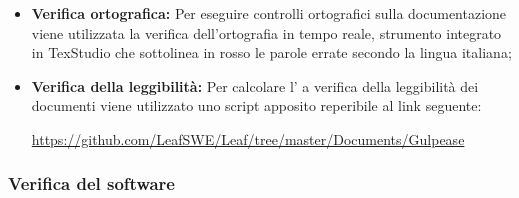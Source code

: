 \documentclass[../NormediProgetto.tex]{subfiles}
\begin{document}
	\begin{itemize}
		\item \textbf{Verifica ortografica:} Per eseguire controlli ortografici sulla documentazione viene utilizzata la verifica dell’ortografia in tempo reale, strumento integrato in TexStudio che sottolinea in rosso le parole errate secondo la lingua italiana;
		
		\item \textbf{Verifica della leggibilità:} Per calcolare l' a verifica della leggibilità dei documenti viene utilizzato uno script apposito reperibile al link seguente:
		\begin{center}
			\centerline{\url{https://github.com/LeafSWE/Leaf/tree/master/Documents/Gulpease}}
		\end{center}
	\end{itemize}
	
	\subsubsection{Verifica del software}
	
\end{document}

